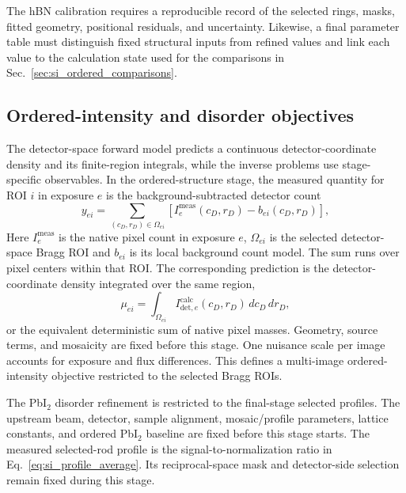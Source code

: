 The hBN calibration requires a reproducible record of the selected rings, masks, fitted geometry, positional residuals, and uncertainty. Likewise, a final parameter table must distinguish fixed structural inputs from refined values and link each value to the calculation state used for the comparisons in Sec.~\ref{sec:si_ordered_comparisons}.

\subsection{Ordered-intensity and disorder objectives}
\label{subsec:si_detector_derived_objectives}

The detector-space forward model predicts a continuous detector-coordinate density and its finite-region integrals, while the inverse problems use stage-specific observables. In the ordered-structure stage, the measured quantity for ROI $i$ in exposure $e$ is the background-subtracted detector count
\[
  y_{ei}=\sum_{(c_D,r_D)\in\Omega_{ei}}\left[I_e^{\mathrm{meas}}(c_D,r_D)-b_{ei}(c_D,r_D)\right],
\]
Here $I_e^{\mathrm{meas}}$ is the native pixel count in exposure $e$, $\Omega_{ei}$ is the selected detector-space Bragg ROI and $b_{ei}$ is its local background count model. The sum runs over pixel centers within that ROI. The corresponding prediction is the detector-coordinate density integrated over the same region,
\[
  \mu_{ei}=\int_{\Omega_{ei}} I_{\mathrm{det},e}^{\mathrm{calc}}(c_D,r_D)\,dc_D\,dr_D,
\]
or the equivalent deterministic sum of native pixel masses. Geometry, source terms, and mosaicity are fixed before this stage. One nuisance scale per image accounts for exposure and flux differences. This defines a multi-image ordered-intensity objective restricted to the selected Bragg ROIs.

The PbI$_2$ disorder refinement is restricted to the final-stage selected profiles. The upstream beam, detector, sample alignment, mosaic/profile parameters, lattice constants, and ordered PbI$_2$ baseline are fixed before this stage starts. The measured selected-rod profile is the signal-to-normalization ratio in Eq.~\eqref{eq:si_profile_average}. Its reciprocal-space mask and detector-side selection remain fixed during this stage.

